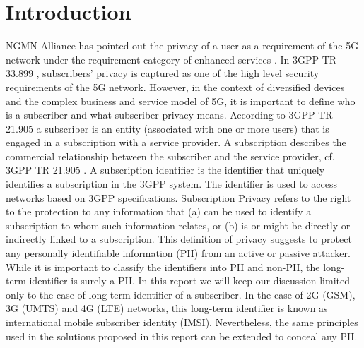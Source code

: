 \documentclass[lnicst,sechang,a4paper]{svmultln}
\begin{document}
\section{Introduction}
\label{intro} NGMN Alliance has pointed out the privacy of a user as a requirement of the 5G network under the requirement category of enhanced services \cite{NGMN_white_paper}. In 3GPP TR 33.899 \cite{TR33899}, subscribers' privacy is captured as one of the high level security requirements of the 5G network. However, in the context of diversified devices and the complex business and service model of 5G, it is important to define who is a subscriber and what subscriber-privacy means. According to 3GPP TR 21.905 \cite{TR21905} a subscriber is an entity (associated with one or more users) that is engaged in a subscription with a service provider. A subscription describes the commercial relationship between the subscriber and the service provider, cf. 3GPP TR 21.905 \cite{TR21905}. A subscription identifier is the identifier that uniquely identifies a subscription in the 3GPP system. The identifier is used to access networks based on 3GPP specifications. Subscription Privacy refers to the right to the protection to any information that (a) can be used to identify a subscription to whom such information relates, or (b) is or might be directly or indirectly linked to a subscription. This definition of privacy suggests to protect any personally identifiable information (PII) from an active or passive attacker. While it is important to classify the identifiers into PII and non-PII, the long-term identifier is surely a PII. In this report we will keep our discussion limited only to the case of long-term identifier of a subscriber. In the case of 2G (GSM), 3G (UMTS) and 4G (LTE) networks, this long-term identifier is known as international mobile subscriber identity (IMSI). Nevertheless, the same principles used in the solutions proposed in this report can be extended to conceal any PII.
\end{document}
